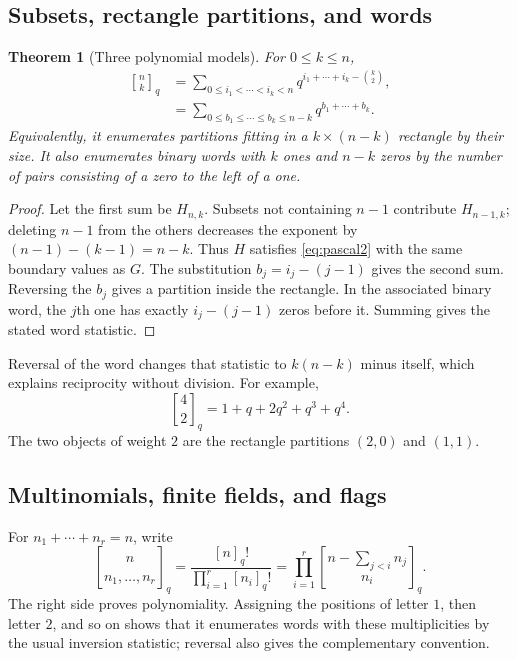 \documentclass[11pt,a4paper]{article}
\numberwithin{equation}{section}
\newtheorem{theorem}{Theorem}[section]
\theoremstyle{definition}
\theoremstyle{remark}
\newcommand{\G}[2]{\genfrac{[}{]}{0pt}{}{#1}{#2}_{q}}
\newcommand{\Gb}[3]{\genfrac{[}{]}{0pt}{}{#1}{#2}_{#3}}
\newcommand{\qfac}[1]{[#1]_q!}
\begin{document}
\subsection{Subsets, rectangle partitions, and words}
\begin{theorem}[Three polynomial models]
\label{thm:subset}
For $0\le k\le n$,
\begin{align}
 \G nk
 &=\sum_{0\le i_1<\cdots<i_k<n}
       q^{i_1+\cdots+i_k-\binom k2},
 \label{eq:subset}\\
 &=\sum_{0\le b_1\le\cdots\le b_k\le n-k}q^{b_1+\cdots+b_k}.
 \label{eq:rectangle}
\end{align}
Equivalently, it enumerates partitions fitting in a $k\times(n-k)$
rectangle by their size. It also enumerates binary words with $k$ ones
and $n-k$ zeros by the number of pairs consisting of a zero to the left
of a one.
\end{theorem}
\begin{proof}
Let the first sum be $H_{n,k}$. Subsets not containing $n-1$ contribute
$H_{n-1,k}$; deleting $n-1$ from the others decreases the exponent by
$(n-1)-(k-1)=n-k$. Thus $H$ satisfies \cref{eq:pascal2} with the same
boundary values as $G$. The substitution $b_j=i_j-(j-1)$ gives the second
sum. Reversing the $b_j$ gives a partition inside the rectangle.
In the associated binary word, the $j$th one has exactly
$i_j-(j-1)$ zeros before it. Summing gives the stated word statistic.
\end{proof}
Reversal of the word changes that statistic to $k(n-k)$ minus itself,
which explains reciprocity without division. For example,
\begin{equation}
 \G42=1+q+2q^2+q^3+q^4.
 \label{eq:G42}
\end{equation}
The two objects of weight $2$ are the rectangle partitions $(2,0)$ and
$(1,1)$.

\subsection{Multinomials, finite fields, and flags}
For $n_1+\cdots+n_r=n$, write
\begin{equation}
 \Gb n{n_1,\ldots,n_r}q
 =\frac{\qfac n}{\prod_{i=1}^r\qfac{n_i}}
 =\prod_{i=1}^r\G{n-\sum_{j<i}n_j}{n_i}.
 \label{eq:qmultinomial}
\end{equation}
The right side proves polynomiality. Assigning the positions of letter
$1$, then letter $2$, and so on shows that it enumerates words with these
multiplicities by the usual inversion statistic; reversal also gives the
complementary convention.
\end{document}
